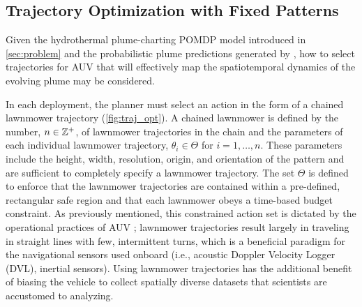 \subsection{Trajectory Optimization with Fixed Patterns}
\label{sec:to}
Given the hydrothermal plume-charting POMDP model introduced in \cref{sec:problem} and the probabilistic plume predictions generated by \PHUMES, how to select trajectories for AUV \Sentry that will effectively map the spatiotemporal dynamics of the evolving plume may be considered. %

In each deployment, the planner must select an action in the form of a chained lawnmower trajectory (\cref{fig:traj_opt}). A chained lawnmower is defined by the number, $n \in \mathbb{Z}^+$, of lawnmower trajectories in the chain and the parameters of each individual lawnmower trajectory, $\theta_i \in \Theta$ for $i = 1, \dots, n$. These parameters include the height, width, resolution, origin, and orientation of the pattern and are sufficient to completely specify a lawnmower trajectory. The set $\Theta$ is defined to enforce that the lawnmower trajectories are contained within a pre-defined, rectangular safe region and that each lawnmower obeys a time-based budget constraint. As previously mentioned, this constrained action set is dictated by the operational practices of AUV \Sentry; lawnmower trajectories result largely in \Sentry traveling in straight lines with few, intermittent turns, which is a beneficial paradigm for the navigational sensors used onboard (i.e., acoustic Doppler Velocity Logger (DVL), inertial sensors). Using lawnmower trajectories has the additional benefit of biasing the vehicle to collect spatially diverse datasets that scientists are accustomed to analyzing. 

